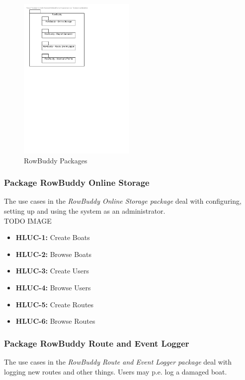 	\begin{figure}[h!]
		\begin{center}
			\includegraphics[width=0.5\textwidth]{./figures/rowbuddy_packages.pdf}
			\caption{RowBuddy Packages}
			\label{img:rowbuddyPackages}
		\end{center}
	\end{figure}
	
	
	
		\subsubsection{Package RowBuddy Online Storage}
		The use cases in the \textit{RowBuddy Online Storage package} deal with configuring, setting up and using the system as an administrator.\\
				
		TODO IMAGE
		\begin{itemize}
			\item \textbf{HLUC-1:} Create Boats
			\item \textbf{HLUC-2:} Browse Boats
			\item \textbf{HLUC-3:} Create Users
			\item \textbf{HLUC-4:} Browse Users
			\item \textbf{HLUC-5:} Create Routes
			\item \textbf{HLUC-6:} Browse Routes
		\end{itemize}		
		
		
		\subsubsection{Package RowBuddy Route and Event Logger}
		The use cases in the \textit{RowBuddy Route and Event Logger package} deal with logging new routes and other things. Users may p.e. log a damaged boat.\\
		
